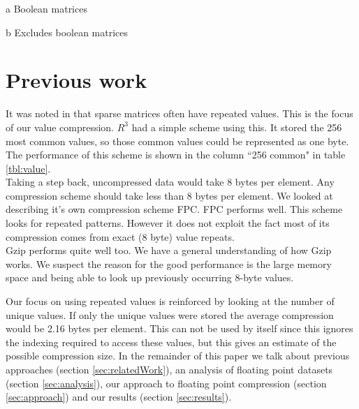 \begin{table*}
\begin{threeparttable}
\begin{tabular}{ccccccccc}
\hline
\end{tabular}
\begin{tablenotes}
\item [a] Boolean matrices
\item [b] Excludes boolean matrices
\end{tablenotes}
\end{threeparttable}
\end{table*}
%
\section{Previous work}
\label{sec:val}
It was noted in \cite{prelim:kourtis} that sparse matrices often have repeated values. This is the focus of our value compression. $R^3$ had a simple scheme using this. It stored the 256 most common values, so those common values could be represented as one byte. The performance of this scheme is shown in the column ``256 common" in table \ref{tbl:value}.\\
\indent Taking a step back, uncompressed data would take 8 bytes per element. Any compression scheme should take less than 8 bytes per element. We looked at \cite{smac:burtscher} describing it's own compression scheme FPC. FPC performs well. This scheme looks for repeated patterns. However it does not exploit the fact most of its compression comes from exact (8 byte) value repeats.\\
\indent Gzip performs quite well too. We have a general understanding of how Gzip works. We suspect the reason for the good performance is the large memory space and being able to look up previously occurring 8-byte values.\par
\indent Our focus on using repeated values is reinforced by looking at the number of unique values. If only the unique values were stored the average compression would be 2.16 bytes per element. This can not be used by itself since this ignores the indexing required to access these values, but this gives an estimate of the possible compression size.%
\indent In the remainder of this paper we talk about 
\ifshort
\else
previous approaches (section \ref{sec:relatedWork}), 
\fi
an analysis of floating point datasets (section \ref{sec:analysis}), our approach to floating point compression (section \ref{sec:approach}) and our results (section \ref{sec:results}).
